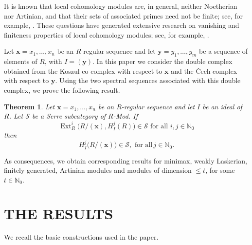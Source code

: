 \documentclass[12pt,twoside, final]{amsart}
\numberwithin{equation}{section}
\newtheorem{theorem}{Theorem}[section]
\theoremstyle{definition}
\newcommand{\Ext}{\operatorname{Ext}}
\newcommand{\NN}{\mathbb N_0}
\begin{document}
It is known that local cohomology modules are, in general, neither
Noetherian nor Artinian, and that their sets of associated primes need
not be finite; see, for example, \cite{Singh}. These questions have
generated extensive research on vanishing and finiteness properties
of local cohomology modules; see, for example,
\cite{DoseaMiranda, EghbaliBoix, g, Lyubeznik93, Lyubeznik06}.

Let $\mathbf{x}=x_1,\ldots,x_n$ be an $R$-regular sequence and let
$\mathbf{y}=y_1,\ldots,y_m$ be a sequence of elements of $R$, with
$I=(\mathbf y)$. In this paper we consider the double complex obtained
from the Koszul co-complex with respect to $\mathbf{x}$ and the
\v{C}ech complex with respect to $\mathbf y$. Using the two spectral
sequences associated with this double complex, we prove the following
result.

\begin{theorem}\label{thm:main}
Let $\mathbf{x}=x_1,\ldots,x_n$ be an $R$-regular sequence and let
$I$ be an ideal of $R$. Let $\mathcal S$ be a Serre subcategory of
$R$-Mod. If
\[
\Ext_R^i\bigl(R/(\mathbf x),H_I^j(R)\bigr)\in\mathcal S\,\,\text{for all}\,\,i,j\in\NN
\]
  then
\[
H_I^j\bigl(R/(\mathbf x)\bigr)\in\mathcal S,\,\,\text{for all}\,j\in\NN.
\]
\end{theorem}
As consequences, we obtain corresponding results for minimax,
 weakly Laskerian, finitely generated, Artinian modules and 
 modules of dimension $\leq t$, for some $t\in \NN$.
\section{THE RESULTS}

We recall the basic constructions used in the paper.
\end{document}
